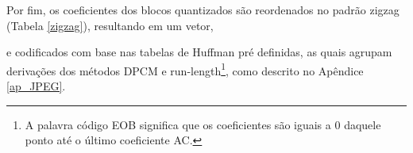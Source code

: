 
Por fim, os coeficientes dos blocos quantizados são reordenados no padrão zigzag (Tabela \ref{zigzag}), resultando em um vetor,

\begin{minipage}{1.\textwidth}
\centering
[-26 -3 1 -3 -2 -6 2 -4 1 -4 1 1 5 0 2 0 0 -1 2 0 0 0 0 0 -1 -1 EOB]
\end{minipage}
e codificados com base nas tabelas de Huffman pré definidas, as quais agrupam derivações dos métodos DPCM e run-length\footnote{A palavra código EOB significa que os coeficientes são iguais a $ 0 $ daquele ponto até o último coeficiente AC.}, como descrito no Apêndice \ref{ap_JPEG}.

